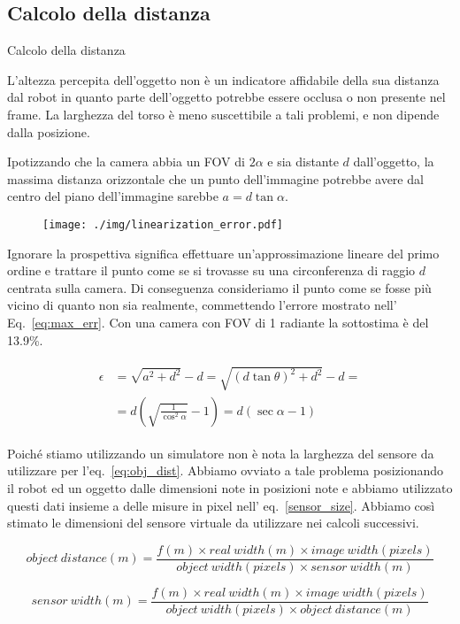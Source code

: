 \documentclass[aspectratio=169, leqno]{beamer}
\begin{document}
	\subsection{Calcolo della distanza}\label{subsec:Calcolo-della-distanza}
	\begin{frame}[allowframebreaks]{Calcolo della distanza}

		L’altezza percepita dell’oggetto non è un indicatore affidabile della
		sua distanza dal robot in quanto parte dell’oggetto potrebbe essere
		occlusa o non presente nel frame. La larghezza del torso è
		meno suscettibile a tali problemi, e non dipende dalla posizione. 

		Ipotizzando che la camera abbia un FOV di $2\alpha$ e sia distante $d$
		dall'oggetto, la massima distanza orizzontale che un punto
		dell'immagine potrebbe avere dal centro del piano dell'immagine sarebbe
		$a = d \tan \alpha$.
		
		\begin{figure}[H]
			\centering
			\texttt{[image: ./img/linearization\_error.pdf]}
		\end{figure}
		
		Ignorare la prospettiva significa effettuare un'approssimazione lineare
		del primo ordine e trattare il punto come se si trovasse su una
		circonferenza di raggio $d$ centrata sulla camera. Di conseguenza
		consideriamo il punto come se fosse più vicino di quanto non sia
		realmente, commettendo l'errore mostrato nell' Eq.~\ref{eq:max_err}.
		Con una camera con FOV di 1 radiante la sottostima è del 13.9\%.
		
		\begin{gather}
		\begin{aligned}
		\epsilon &= 
		\sqrt{a^2+d^2} - d =
		\sqrt{(d\tan \theta )^2+d^2}-d =\\
		&=d\left( \sqrt{\frac{1}{\cos ^2 \alpha}}-1 \right) =
		d \left( \sec \alpha -1 \right) 
		\end{aligned}
		\label{eq:max_err}
		\end{gather}
		
		\framebreak
		
		Poiché stiamo utilizzando un simulatore non è nota la larghezza del
		sensore da utilizzare per l'eq.~\ref{eq:obj_dist}. Abbiamo ovviato a
		tale problema posizionando il robot ed un oggetto dalle dimensioni note
		in posizioni note e abbiamo utilizzato questi dati insieme a delle
		misure in pixel nell' eq.~\ref{sensor_size}. Abbiamo così stimato le
		dimensioni del sensore virtuale da utilizzare nei calcoli successivi.
		
		\begin{equation}\label{eq:obj_dist}
		object~distance(m) = 
		\frac{f(m) \times real~width(m) \times image~width(pixels)}
		{object~width(pixels) \times sensor~width(m)}
		\end{equation}
		
		\begin{equation}\label{sensor_size}
		sensor~width(m) = 
		\frac{f(m) \times real~width(m) \times image~width(pixels)}
		{object~width(pixels) \times object~distance(m)}
		\end{equation}

	\end{frame}
	
\end{document}

